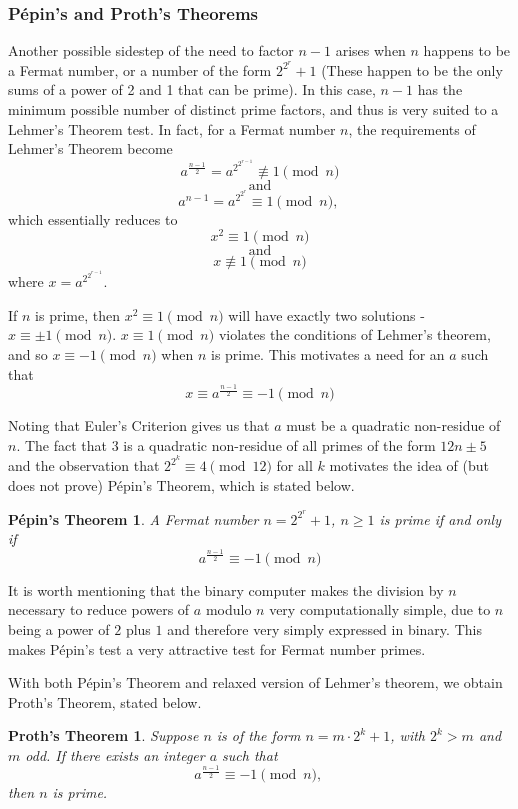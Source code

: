 \documentclass{article}
\begin{document}
\subsubsection{P\'{e}pin's and Proth's Theorems}
Another possible sidestep of the need to factor $n-1$ arises when $n$ happens to be a Fermat number, or a number of the form $2^{2^r} + 1$ (These happen to be the only sums of a power of 2 and 1 that can be prime). In this case, $n - 1$ has the minimum possible number of distinct prime factors, and thus is very suited to a Lehmer's Theorem test. In fact, for a Fermat number $n$, the requirements of Lehmer's Theorem become
	$$a^{\frac{n - 1}{2}} = a^{2^{2^{r-1}}} \not\equiv 1 \pmod n $$
	$$\text{ and } $$
	$$a^{n - 1} = a^{2^{2^{r}}} \equiv 1 \pmod n \text{, }$$
which essentially reduces to 
	$$x^2 \equiv 1 \pmod n$$
	$$\text{ and }$$
	$$x \not \equiv 1 \pmod n$$
where $x = a^{2^{2^{r-1}}}$.

If $n$ is prime, then $x^2 \equiv 1 \pmod n$ will have exactly two solutions - $x \equiv \pm 1 \pmod n$. $x \equiv 1 \pmod n$ violates the conditions of Lehmer's theorem, and so $x \equiv -1 \pmod n$ when $n$ is prime. This motivates a need for an $a$ such that 
	$$x \equiv a^{\frac{n - 1}{2}} \equiv -1 \pmod n$$
	
\par Noting that Euler's Criterion gives us that $a$ must be a quadratic non-residue of $n$. The fact that $3$ is a quadratic non-residue of all primes of the form $12n \pm 5$ and the observation that $2^{2^k} \equiv 4 \pmod 12$ for all $k$ motivates the idea of (but does not prove) P\'{e}pin's Theorem, which is stated below.

\newtheorem*{pepin}{P\'{e}pin's Theorem}
\begin{pepin}
A Fermat number $n = 2^{2^r} + 1$, $n \geq 1$ is prime if and only if 
	$$ a^{\frac{n - 1}{2}} \equiv  - 1 \pmod n$$
\end{pepin}

It is worth mentioning that the binary computer makes the division by $n$ necessary to reduce powers of $a$ modulo $n$ very computationally simple, due to $n$ being a power of $2$ plus $1$ and therefore very simply expressed in binary. This makes P\'{e}pin's test a very attractive test for Fermat number primes. 

With both  P\'{e}pin's Theorem and relaxed version of Lehmer's theorem, we obtain Proth's Theorem, stated below.

\newtheorem*{proth}{Proth's Theorem}
\begin{proth}
Suppose $n$ is of the form $n = m \cdot 2^k + 1$, with $2^k > m$ and $m$ odd. If there exists an integer $a$ such that 
	$$a^{\frac{n-1}{2}} \equiv -1 \pmod n \text{, }$$
then $n$ is prime.
\end{proth}
\end{document}

